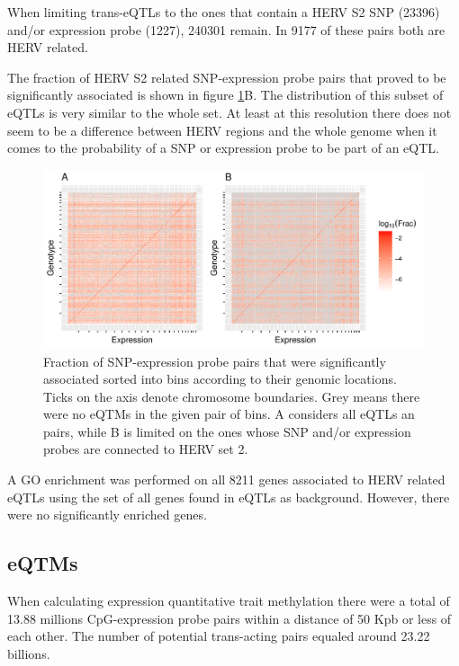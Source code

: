 \documentclass[a4paper,12pt]{article}
\begin{document}
When limiting trans-eQTLs to the ones that contain a HERV S2 SNP (23396) and/or expression probe (1227), 240301 remain. In 9177 of these pairs both are HERV related. 

The fraction of HERV S2 related SNP-expression probe pairs that proved to be significantly associated is shown in figure \ref{fig:global.eqtl.heatmap}B. The distribution of this subset of eQTLs is very similar to the whole set. At least at this resolution there does not seem to be a difference between HERV regions and the whole genome when it comes to the probability of a SNP or expression probe to be part of an eQTL.

\begin{figure}[tb]
	\includegraphics[scale = 1, keepaspectratio = true]{../figures/eqtl_all_herv_heatmap}  
	\caption{Fraction of SNP-expression probe pairs that were significantly associated sorted into bins according to their genomic locations. Ticks on the axis denote chromosome boundaries. Grey means there were no eQTMs in the given pair of bins. A considers all eQTLs an pairs, while B is limited on the ones whose SNP and/or expression probes are connected to HERV set 2.}
    \label{fig:global.eqtl.heatmap}
\end{figure}

A GO enrichment was performed on all 8211 genes associated to HERV related eQTLs using the set of all genes found in eQTLs as background. However, there were no significantly enriched genes. 

\subsection{eQTMs}
When calculating expression quantitative trait methylation there were a total of 13.88 millions CpG-expression probe pairs within a distance of 50 Kpb or less of each other. The number of potential trans-acting pairs equaled around 23.22 billions. 
\end{document}
